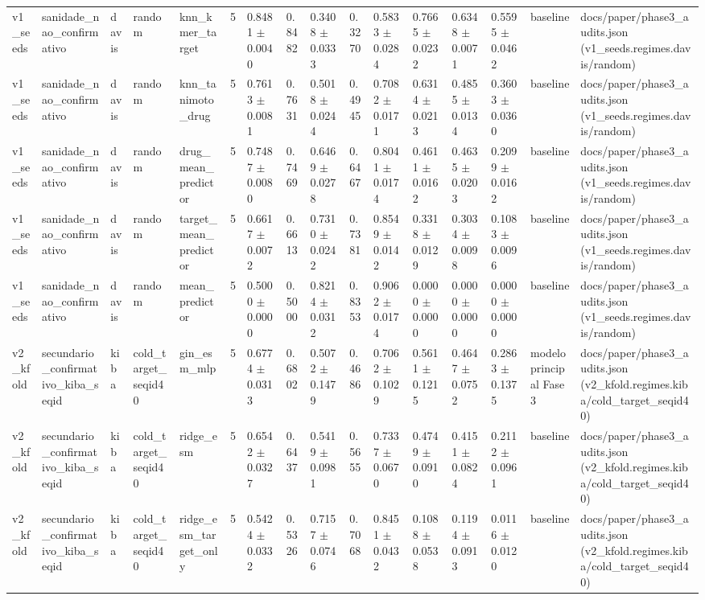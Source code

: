 \begin{table}[htbp]
\begin{tabular}{llllllllllllllll}
v1\_seeds & sanidade\_nao\_confirmativo & davis & random & knn\_kmer\_target & 5 & 0.8481 $\pm$ 0.0040 & 0.8482 & 0.3408 $\pm$ 0.0333 & 0.3270 & 0.5833 $\pm$ 0.0284 & 0.7665 $\pm$ 0.0232 & 0.6348 $\pm$ 0.0071 & 0.5595 $\pm$ 0.0462 & baseline & docs/paper/phase3\_audits.json (v1\_seeds.regimes.davis/random) \\
v1\_seeds & sanidade\_nao\_confirmativo & davis & random & knn\_tanimoto\_drug & 5 & 0.7613 $\pm$ 0.0081 & 0.7631 & 0.5018 $\pm$ 0.0244 & 0.4945 & 0.7082 $\pm$ 0.0171 & 0.6314 $\pm$ 0.0213 & 0.4855 $\pm$ 0.0134 & 0.3603 $\pm$ 0.0360 & baseline & docs/paper/phase3\_audits.json (v1\_seeds.regimes.davis/random) \\
v1\_seeds & sanidade\_nao\_confirmativo & davis & random & drug\_mean\_predictor & 5 & 0.7487 $\pm$ 0.0080 & 0.7469 & 0.6469 $\pm$ 0.0278 & 0.6467 & 0.8041 $\pm$ 0.0174 & 0.4611 $\pm$ 0.0162 & 0.4635 $\pm$ 0.0203 & 0.2099 $\pm$ 0.0162 & baseline & docs/paper/phase3\_audits.json (v1\_seeds.regimes.davis/random) \\
v1\_seeds & sanidade\_nao\_confirmativo & davis & random & target\_mean\_predictor & 5 & 0.6617 $\pm$ 0.0072 & 0.6613 & 0.7310 $\pm$ 0.0242 & 0.7381 & 0.8549 $\pm$ 0.0142 & 0.3318 $\pm$ 0.0129 & 0.3034 $\pm$ 0.0098 & 0.1083 $\pm$ 0.0096 & baseline & docs/paper/phase3\_audits.json (v1\_seeds.regimes.davis/random) \\
v1\_seeds & sanidade\_nao\_confirmativo & davis & random & mean\_predictor & 5 & 0.5000 $\pm$ 0.0000 & 0.5000 & 0.8214 $\pm$ 0.0312 & 0.8353 & 0.9062 $\pm$ 0.0174 & 0.0000 $\pm$ 0.0000 & 0.0000 $\pm$ 0.0000 & 0.0000 $\pm$ 0.0000 & baseline & docs/paper/phase3\_audits.json (v1\_seeds.regimes.davis/random) \\
v2\_kfold & secundario\_confirmativo\_kiba\_seqid & kiba & cold\_target\_seqid40 & gin\_esm\_mlp & 5 & 0.6774 $\pm$ 0.0313 & 0.6802 & 0.5072 $\pm$ 0.1479 & 0.4686 & 0.7062 $\pm$ 0.1029 & 0.5611 $\pm$ 0.1215 & 0.4647 $\pm$ 0.0752 & 0.2863 $\pm$ 0.1375 & modelo principal Fase 3 & docs/paper/phase3\_audits.json (v2\_kfold.regimes.kiba/cold\_target\_seqid40) \\
v2\_kfold & secundario\_confirmativo\_kiba\_seqid & kiba & cold\_target\_seqid40 & ridge\_esm & 5 & 0.6542 $\pm$ 0.0327 & 0.6437 & 0.5419 $\pm$ 0.0981 & 0.5655 & 0.7337 $\pm$ 0.0670 & 0.4749 $\pm$ 0.0910 & 0.4151 $\pm$ 0.0824 & 0.2112 $\pm$ 0.0961 & baseline & docs/paper/phase3\_audits.json (v2\_kfold.regimes.kiba/cold\_target\_seqid40) \\
v2\_kfold & secundario\_confirmativo\_kiba\_seqid & kiba & cold\_target\_seqid40 & ridge\_esm\_target\_only & 5 & 0.5424 $\pm$ 0.0332 & 0.5326 & 0.7157 $\pm$ 0.0746 & 0.7068 & 0.8451 $\pm$ 0.0432 & 0.1088 $\pm$ 0.0538 & 0.1194 $\pm$ 0.0913 & 0.0116 $\pm$ 0.0120 & baseline & docs/paper/phase3\_audits.json (v2\_kfold.regimes.kiba/cold\_target\_seqid40) \\

\end{tabular}
\end{table}
